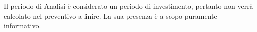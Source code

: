 Il periodo di Analisi è considerato un periodo di investimento, pertanto non verrà calcolato nel preventivo a finire. La sua presenza è a scopo puramente informativo.